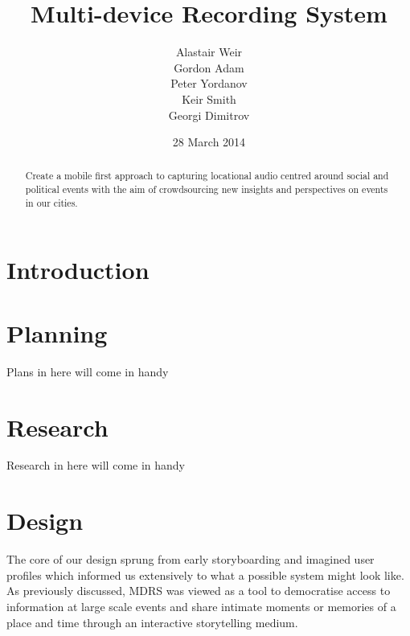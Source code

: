 \documentclass{l3proj}
\begin{document}
\title{Multi-device Recording System}
\author{Alastair Weir \\
        Gordon Adam \\
        Peter Yordanov \\
        Keir Smith \\
        Georgi Dimitrov}
\date{28 March 2014}
\maketitle
\begin{abstract}

Create a mobile first approach to capturing locational audio centred around
social and political events with the aim of crowdsourcing new insights and
perspectives on events in our cities.

\end{abstract}
\educationalconsent
\tableofcontents
\chapter{Introduction}
\label{intro}

\chapter{Planning}
\label{Planning}

Plans in here will come in handy

\chapter{Research}
\label{Research}

Research in here will come in handy

\chapter{Design}
\label{design}

The core of our design sprung from early storyboarding and imagined user
profiles which informed us extensively to what a possible system might look
like. As previously discussed, MDRS was viewed as a tool to democratise access
to information at large scale events and share intimate moments or memories of a
place and time through an interactive storytelling medium.
\end{document}
